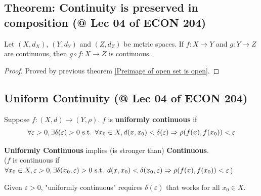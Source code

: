 \documentclass[11pt]{elegantbook}
\begin{document}
\subsection{Theorem: Continuity is preserved in composition \small{(@ Lec 04 of ECON 204)}}
\begin{theorem}
    Let $(X, d_X)$, $(Y, d_Y)$ and $(Z, d_Z)$ be metric spaces. If $f : X \rightarrow Y$ and $g : Y \rightarrow Z$ are continuous, then $g \circ f : X \rightarrow Z$ is
    continuous.
\end{theorem}
\begin{proof}
    Proved by previous theorem \ref{Preimage of open set is open}.
\end{proof}

\subsection{Uniform Continuity \small{(@ Lec 04 of ECON 204)}}
\begin{definition}
\normalfont
    Suppose $f : (X, d) \rightarrow (Y, \rho)$. $f$ is \textbf{uniformly continuous} if $$\forall \varepsilon>0, \exists \delta(\varepsilon)>0 \textnormal{ s.t. }\forall x_0\in X, d(x,x_0)<\delta(\varepsilon) \Rightarrow \rho(f(x), f(x_0))<\varepsilon$$
\end{definition}
\begin{claim}
    \textbf{Uniformly Continuous} implies (is stronger than) \textbf{Continuous}.\\
    ($f$ is continuous if $\forall x_0\in X, \varepsilon>0, \exists \delta(x_0,\varepsilon)>0 \textnormal{ s.t. } d(x,x_0)<\delta(x_0,\varepsilon) \Rightarrow \rho(f(x), f(x_0))<\varepsilon$)
\end{claim}
Given $\varepsilon>0$, "uniformly continuous" requires $\delta(\varepsilon)$ that works for all $x_0\in X$.
\end{document}
